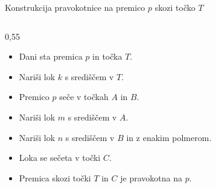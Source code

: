 \begin{frame}{Konstrukcija pravokotnice na premico $p$ skozi točko $T$}
    \begin{columns}
		\begin{column}{0,55\textwidth}
		  \begin{itemize}
			 \item <1->Dani sta premica $p$ in točka $T$.
			 \item <2->Nariši lok $k$ s središčem v $T$.
			 \item <3->Premico $p$ seče v točkah $A$ in $B$.
			 \item <4->Nariši lok $m$ s središčem v $A$.
			 \item <5->Nariši lok $n$ s središčem v $B$ in z enakim polmerom.
			 \item <6->Loka se sečeta v točki $C$.
			 \item <7->Premica skozi točki $T$ in $C$ je pravokotna na $p$.
		  \end{itemize}
        \end{column}
		\begin{column}{0.45\textwidth}
		\centering
\end{column}
\end{columns}
\end{frame}
